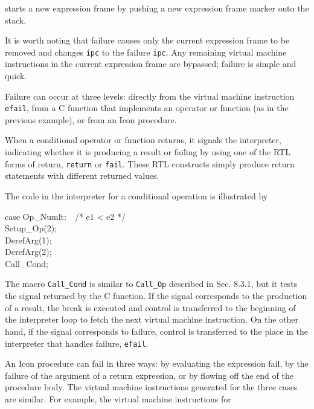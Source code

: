 
\noindent starts a new expression frame by pushing a new expression
frame marker onto the stack.

It is worth noting that failure causes only the current expression
frame to be removed and changes \texttt{ipc} to the failure
\texttt{ipc}. Any remaining virtual machine instructions in the
current expression frame are bypassed; failure is simple and quick.

Failure can occur at three levels: directly from the virtual machine
instruction \texttt{efail}, from a C function that implements an
operator or function (as in the previous example), or from an Icon
procedure.


When a conditional operator or function returns, it signals the
interpreter, indicating whether it is producing a result or failing by
using one of the RTL forms of return, \texttt{return} or
\texttt{fail}. These RTL constructs simply produce return statements
with different returned values.

The code in the interpreter for a conditional operation is illustrated by

\begin{iconcode}
\>case Op\_Numlt:\ \ \>\>\>\>\>\>/* e1 < e2 */\\
\>\>Setup\_Op(2);\\
\>\>DerefArg(1);\\
\>\>DerefArg(2);\\
\>\>Call\_Cond;
\end{iconcode}

The macro \texttt{Call\_Cond} is similar to \texttt{Call\_Op}
described in Sec. 8.3.1, but it tests the signal returned by the C
function. If the signal corresponds to the production of a result, the
break is executed and control is transferred to the beginning of the
interpreter loop to fetch the next virtual machine instruction. On the
other hand, if the signal corresponds to failure, control is
transferred to the place in the interpreter that handles failure,
\texttt{efail}.


An Icon procedure can fail in three ways: by evaluating the expression
fail, by the failure of the argument of a return expression, or by
flowing off the end of the procedure body. The virtual machine
instructions generated for the three cases are similar. For example,
the virtual machine instructions for


